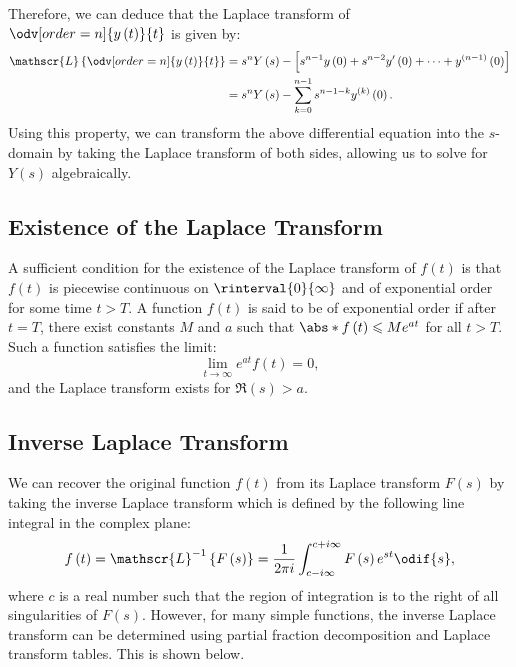 \documentclass{article}
\begin{document}
Therefore, we can deduce that the Laplace transform of
\(\displaystyle \odv[order=n]{y\left( t \right)}{t}\) is given by:
\begin{align*}
    \mathscr{L}\left\{ \odv[order=n]{y\left( t \right)}{t} \right\} & = s^n Y\left( s \right) - \left[ s^{n-1} y\left( 0 \right) + s^{n-2} y'\left( 0 \right) + \cdots + y^{\left( n-1 \right)}\left( 0 \right) \right] \\
                                                                    & = s^n Y\left( s \right) - \sum_{k=0}^{n-1} s^{n-1-k} y^{\left( k \right)}\left( 0 \right).
\end{align*}
Using this property, we can transform the above differential equation
into the \(s\)-domain by taking the Laplace transform of both sides,
allowing us to solve for \(Y\left( s \right)\) algebraically.
\subsection{Existence of the Laplace Transform}
A sufficient condition for the existence of the Laplace transform of
\(f\left( t \right)\) is that \(f\left( t \right)\) is piecewise
continuous on \(\rinterval{0}{\infty}\) and of exponential order for
some time \(t > T\). A function \(f\left( t \right)\) is said to be of
exponential order if after \(t = T\), there exist constants \(M\) and
\(a\) such that \(\abs*{f\left( t \right)} \leqslant M e^{at}\) for all
\(t > T\). Such a function satisfies the limit:
\begin{equation*}
    \lim_{t \to \infty} e^{at} f\left( t \right) = 0,
\end{equation*}
and the Laplace transform exists for \(\Re\left( s \right) > a\).
\subsection{Inverse Laplace Transform}
We can recover the original function \(f\left( t \right)\) from its
Laplace transform \(F\left( s \right)\) by taking the inverse Laplace
transform which is defined by the following line integral in the
complex plane:
\begin{equation*}
    f\left( t \right) = \mathscr{L}^{-1}\left\{ F\left( s \right) \right\} = \frac{1}{2\pi i} \int_{c - i \infty}^{c + i \infty} F\left( s \right) e^{st} \odif{s},
\end{equation*}
where \(c\) is a real number such that the region of integration is to
the right of all singularities of \(F\left( s \right)\). However, for
many simple functions, the inverse Laplace transform can be determined
using partial fraction decomposition and Laplace transform tables.
This is shown below.
\end{document}
